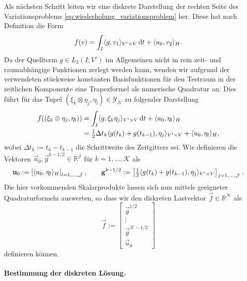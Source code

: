 \documentclass[../main.tex]{subfiles}
\begin{document}
Als nächsten Schritt leiten wir eine diskrete Darstellung der rechten Seite des Variationsproblems \cref{eq:wiederholung_variationsproblem} her.
Diese hat nach Definition die Form
\begin{equation}
    f(v) = \int_{I} \langle g,v_{1}\rangle_{V' \times V} \mathop{}\!\mathrm{d} t + \langle u_{0},v_{2}\rangle_{H}.
\end{equation}
Da der Quellterm $g \in L_{2}(I; V')$ im Allgemeinen nicht in rein zeit- und raumabhängige Funktionen zerlegt werden kann, wenden wir aufgrund der verwendeten stückweise konstanten Basisfunktionen für den Testraum in der zeitlichen Komponente eine Trapezformel als numerische Quadratur an.
Dies führt für das Tupel $(\xi_{k} \otimes \eta_{j}, \eta_{l}) \in \mathcal Y_{\mathcal N}$ zu folgender Darstellung
\begin{align}
    f((\xi_{k} \otimes \eta_{j}, \eta_{l}))
    &= \int_{I} \langle g,\xi_{k} \eta_{j}\rangle_{V' \times V} \mathop{}\!\mathrm{d} t + \langle u_{0},\eta_{l}\rangle_{H}
    \\&= \tfrac{1}{2} \Delta t_{k} \langle g(t_{k}) + g(t_{k - 1}),\eta_{j}\rangle_{V' \times V}
         + \langle u_{0},\eta_{l}\rangle_{H},
\end{align}
wobei $\Delta t_{k} := t_{k} - t_{k - 1}$ die Schrittweite des Zeitgitters sei.
Wir definieren die Vektoren $\vec{u}_{0}, \vec{g}^{k - 1/2} \in \mathbb{R}^{\mathcal J}$ für $k = 1, \dots, \mathcal K$ als
\begin{equation}
    \mathbf{u}_{0} := \left[ \langle u_{0},\eta_{l}\rangle_{H} \right]_{l = 1, \dots, \mathcal J },
    \qquad
    \mathbf{g}^{k - 1/2} := \left[ \tfrac{1}{2} \langle g(t_{k}) + g(t_{k - 1}),\eta_{j}\rangle_{V' \times V}  \right]_{j = 1, \dots, \mathcal J}.
\end{equation}
Die hier vorkommenden Skalarprodukte lassen sich nun mittels geeigneter Quadraturformeln auswerten, so dass wir den diskreten Lastvektor $\vec{f} \in \mathbb{R}^{\mathcal N}$ als
\begin{equation}
    \vec{f} := \begin{bmatrix}
        \vec{g}^{1/2} \\
        \vdots\\
        \vec{g}^{\mathcal K - 1/2}\\
        \vec{u}_{0}
    \end{bmatrix}
\end{equation}
definieren können.

\paragraph{Bestimmung der diskreten Lösung.} %
\label{par:bestimmung_der_diskreten_l_sung_}
\end{document}
